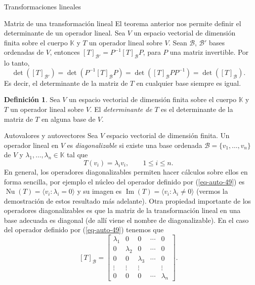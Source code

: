 \documentclass[a4paper,12pt,twoside,spanish,reqno]{amsbook}
\theoremstyle{definition}
\newtheorem{definicion}{Definici\'on}[section]
\theoremstyle{remark}
\newcommand{\img}{\operatorname{Im}}
\newcommand{\nuc}{\operatorname{Nu}}
\newcommand{\K}{\mathbb K}
\begin{document}
\begin{chapter}{Transformaciones lineales}
\begin{section}{Matriz de una transformación lineal}
        El teorema anterior nos permite definir el determinante de un operador lineal.	Sea $V$ un espacio vectorial de dimensión finita sobre el cuerpo $\K$ y $T$ un operador lineal sobre $V$. Sean  $\mathcal B$, $\mathcal B'$ 
        bases ordenadas de $V$, entonces $[T]_{\mathcal B'} = P^{-1}[T]_{\mathcal B}P$, para $P$ una matriz invertible. Por lo tanto, 
        \begin{equation*}
            \det([T]_{\mathcal B'}) = \det(P^{-1}[T]_{\mathcal B}  P) =  \det([T]_{\mathcal B}  PP^{-1}) =  \det([T]_{\mathcal B}). 
        \end{equation*}
        Es decir,  el determinante de la matriz de $T$ en cualquier base siempre es igual.
        
        \begin{definicion} 
                Sea $V$ un espacio vectorial de dimensión finita sobre el cuerpo $\K$ y $T$ un operador lineal sobre $V$. El \textit{determinante de $T$} es el determinante de la matriz de $T$ en alguna base de $V$.  
        \end{definicion}
        \end{section}
    
    
    
    
    
    
    
        \begin{section}{Autovalores y autovectores}
        Sea $V$ espacio vectorial de dimensión finita. Un operador lineal en $V$ es \textit{diagonalizable}  si existe una base ordenada $\mathcal B= \{v_1,\ldots,v_n\}$ de $V$ y $\lambda_1,\ldots,\lambda_n \in \K$ tal que 
        \begin{equation}\label{eq-auto-49}
            T(v_i) = \lambda_i v_i,\qquad 1\le i \le n. 
        \end{equation}
        En  general, los operadores diagonalizables permiten hacer cálculos sobre ellos en forma sencilla, por ejemplo el núcleo del  operador definido por (\ref{eq-auto-49}) es $\nuc(T)=\langle v_i: \lambda_i =0 \rangle$ y  su imagen es $\img(T)=\langle v_i: \lambda_i \not=0 \rangle$ (vermos la demostración de estos resultado más adelante). 
        Otra propiedad importante de los operadores diagonalizables es que la matriz de la transformación lineal en una base adecuada es diagonal (de allí viene el nombre de diagonalizable). En  el caso del  operador definido por (\ref{eq-auto-49}) tenemos que
        $$
        [T]_{\mathcal B} = 
        \begin{bmatrix}
        \lambda_1&0&0&\cdots&0 \\
        0&\lambda_2&0&\cdots&0\\
        0&0&\lambda_3&\cdots&0\\
        \vdots&\vdots&\vdots&&\vdots\\
        0&0&0&\cdots&\lambda_n
        \end{bmatrix}.
        $$
        

\end{section}
\end{chapter}
\end{document}
